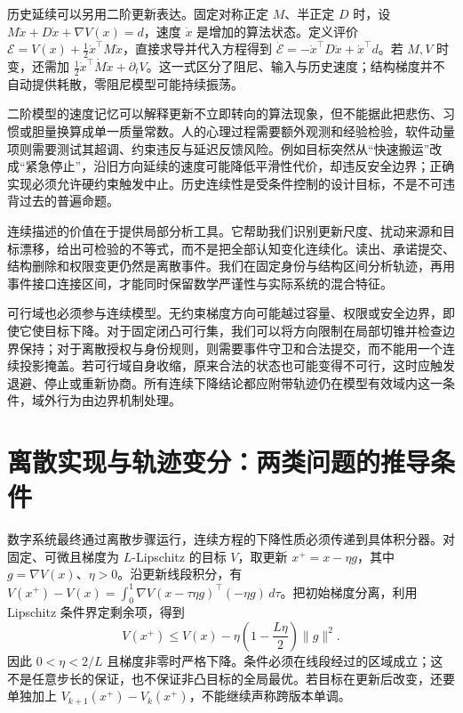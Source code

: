 历史延续可以另用二阶更新表达。固定对称正定 $M$、半正定 $D$ 时，设 $M\ddot x+D\dot x+\nabla V(x)=d$，速度 $\dot x$ 是增加的算法状态。定义评价 $\mathcal E=V(x)+\frac12\dot x^\top M\dot x$，直接求导并代入方程得到 $\dot{\mathcal E}=-\dot x^\top D\dot x+\dot x^\top d$。若 $M,V$ 时变，还需加 $\frac12\dot x^\top\dot M\dot x+\partial_tV$。这一式区分了阻尼、输入与历史速度；结构梯度并不自动提供耗散，零阻尼模型可能持续振荡。

二阶模型的速度记忆可以解释更新不立即转向的算法现象，但不能据此把悲伤、习惯或胆量换算成单一质量常数。人的心理过程需要额外观测和经验检验，软件动量项则需要测试其超调、约束违反与延迟反馈风险。例如目标突然从“快速搬运”改成“紧急停止”，沿旧方向延续的速度可能降低平滑性代价，却违反安全边界；正确实现必须允许硬约束触发中止。历史连续性是受条件控制的设计目标，不是不可违背过去的普遍命题。

连续描述的价值在于提供局部分析工具。它帮助我们识别更新尺度、扰动来源和目标漂移，给出可检验的不等式，而不是把全部认知变化连续化。读出、承诺提交、结构删除和权限变更仍然是离散事件。我们在固定身份与结构区间分析轨迹，再用事件接口连接区间，才能同时保留数学严谨性与实际系统的混合特征。

可行域也必须参与连续模型。无约束梯度方向可能越过容量、权限或安全边界，即使它使目标下降。对于固定闭凸可行集，我们可以将方向限制在局部切锥并检查边界保持；对于离散授权与身份规则，则需要事件守卫和合法提交，而不能用一个连续投影掩盖。若可行域自身收缩，原来合法的状态也可能变得不可行，这时应触发退避、停止或重新协商。所有连续下降结论都应附带轨迹仍在模型有效域内这一条件，域外行为由边界机制处理。

\section{离散实现与轨迹变分：两类问题的推导条件}
\label{sec:state_discrete_variation}

数字系统最终通过离散步骤运行，连续方程的下降性质必须传递到具体积分器。对固定、可微且梯度为 $L$-Lipschitz 的目标 $V$，取更新 $x^+=x-\eta g$，其中 $g=\nabla V(x)$、$\eta>0$。沿更新线段积分，有 $V(x^+)-V(x)=\int_0^1\nabla V(x-\tau\eta g)^\top(-\eta g)\,d\tau$。把初始梯度分离，利用 Lipschitz 条件界定剩余项，得到
\begin{equation}
 V(x^+)\le V(x)-\eta\left(1-\frac{L\eta}{2}\right)\|g\|^2.
\end{equation}
因此 $0<\eta<2/L$ 且梯度非零时严格下降。条件必须在线段经过的区域成立；这不是任意步长的保证，也不保证非凸目标的全局最优。若目标在更新后改变，还要单独加上 $V_{k+1}(x^+)-V_k(x^+)$，不能继续声称跨版本单调。

